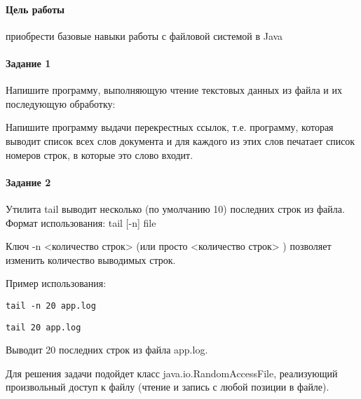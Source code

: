 \paragraph{Цель работы}
приобрести базовые навыки работы с файловой системой в Java

\paragraph{Задание 1}
Напишите программу, выполняющую чтение текстовых данных из файла и их последующую обработку:

Напишите программу выдачи перекрестных ссылок, т.е. программу, которая выводит список
всех слов документа и для каждого из этих слов печатает список номеров строк, в которые это
слово входит.



\paragraph{Задание 2}
Утилита tail выводит несколько (по умолчанию 10) последних строк из файла.
Формат использования: tail [-n] file

Ключ -n <количество строк> (или просто <количество строк> ) позволяет изменить количество выводимых строк.

Пример использования:

\texttt{tail -n 20 app.log}

\texttt{tail 20 app.log}

Выводит 20 последних строк из файла app.log.

Для решения задачи подойдет класс java.io.RandomAccessFile, реализующий произвольный доступ к файлу (чтение и запись с любой позиции в файле).



